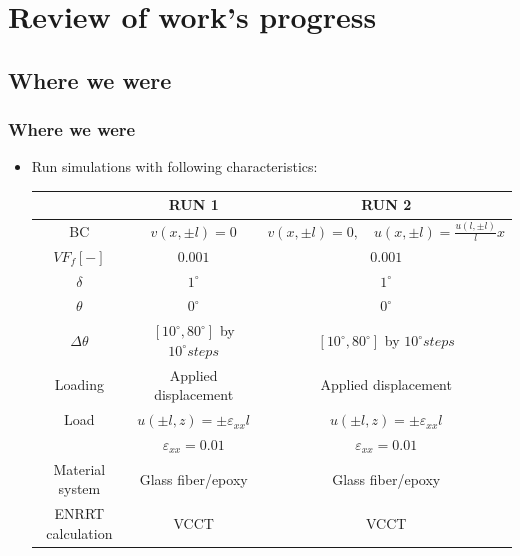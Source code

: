 \documentclass[first,firstsupp,lastsupp,handout,last,hyperref,table]{ETHclass}
\begin{document}
\section{Review of work's progress}

\subsection{Where we were}

\begin{frame}
\frametitle{Where we were}
\vspace{-0.25cm}
\scriptsize
\begin{itemize}[label=]
\item Run simulations with following characteristics:
\begin{table}
\begin{tabular}[!h]{ccc}
\toprule
\midrule
&RUN 1& RUN 2\\
\midrule
BC & $v\left(x,\pm l\right)=0$ & $v\left(x,\pm l\right)=0,\quad u\left(x,\pm l\right)=\frac{u\left(l,\pm l\right)}{l}x$\\[3pt]
$VF_{f}\left[-\right]$&$0.001$&$0.001$\\[3pt]
$\delta$&$1^{\circ}$&$1^{\circ}$\\[3pt]
$\theta$&$0^{\circ}$&$0^{\circ}$\\[3pt]
$\Delta\theta$&$\left[10^{\circ},80^{\circ}\right]$ by $10^{\circ} steps$ &$\left[10^{\circ},80^{\circ}\right]$ by $10^{\circ} steps$ \\[3pt]
Loading&Applied displacement&Applied displacement\\[3pt]
Load&$u\left(\pm l,z\right)=\pm\varepsilon_{xx} l$&$u\left(\pm l,z\right)=\pm\varepsilon_{xx} l$\\[3pt]
&$\varepsilon_{xx}=0.01$&$\varepsilon_{xx}=0.01$\\[3pt]
Material system&Glass fiber/epoxy&Glass fiber/epoxy\\[3pt]
ENRRT calculation&VCCT&VCCT\\
\bottomrule
\end{tabular}
\end{table}
\end{itemize}
\end{frame}
\end{document}
